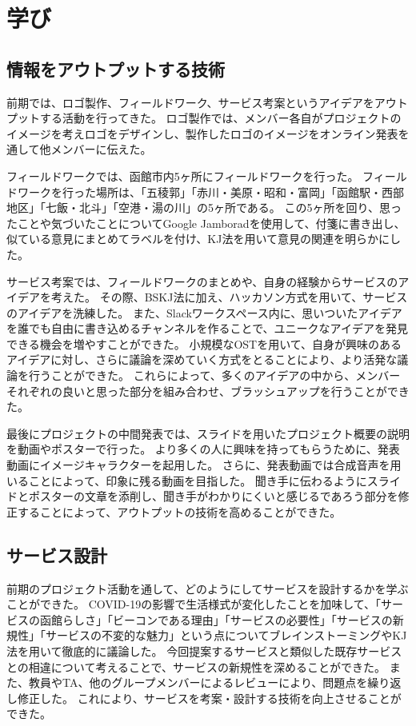 \chapter{学び}

\section{情報をアウトプットする技術}
前期では、ロゴ製作、フィールドワーク、サービス考案というアイデアをアウトプットする活動を行ってきた。
ロゴ製作では、メンバー各自がプロジェクトのイメージを考えロゴをデザインし、製作したロゴのイメージをオンライン発表を通して他メンバーに伝えた。

フィールドワークでは、函館市内5ヶ所にフィールドワークを行った。
フィールドワークを行った場所は、「五稜郭」「赤川・美原・昭和・富岡」「函館駅・西部地区」「七飯・北斗」「空港・湯の川」の5ヶ所である。
この5ヶ所を回り、思ったことや気づいたことについてGoogle Jamboradを使用して、付箋に書き出し、似ている意見にまとめてラベルを付け、KJ法を用いて意見の関連を明らかにした。

サービス考案では、フィールドワークのまとめや、自身の経験からサービスのアイデアを考えた。
その際、BSKJ法に加え、ハッカソン方式を用いて、サービスのアイデアを洗練した。
また、Slackワークスペース内に、思いついたアイデアを誰でも自由に書き込めるチャンネルを作ることで、ユニークなアイデアを発見できる機会を増やすことができた。
小規模なOSTを用いて、自身が興味のあるアイデアに対し、さらに議論を深めていく方式をとることにより、より活発な議論を行うことができた。
これらによって、多くのアイデアの中から、メンバーそれぞれの良いと思った部分を組み合わせ、ブラッシュアップを行うことができた。

最後にプロジェクトの中間発表では、スライドを用いたプロジェクト概要の説明を動画やポスターで行った。
より多くの人に興味を持ってもらうために、発表動画にイメージキャラクターを起用した。
さらに、発表動画では合成音声を用いることによって、印象に残る動画を目指した。
聞き手に伝わるようにスライドとポスターの文章を添削し、聞き手がわかりにくいと感じるであろう部分を修正することによって、アウトプットの技術を高めることができた。

\section{サービス設計}
前期のプロジェクト活動を通して、どのようにしてサービスを設計するかを学ぶことができた。
COVID-19の影響で生活様式が変化したことを加味して、「サービスの函館らしさ」「ビーコンである理由」「サービスの必要性」「サービスの新規性」「サービスの不変的な魅力」という点についてブレインストーミングやKJ法を用いて徹底的に議論した。
今回提案するサービスと類似した既存サービスとの相違について考えることで、サービスの新規性を深めることができた。
また、教員やTA、他のグループメンバーによるレビューにより、問題点を繰り返し修正した。
これにより、サービスを考案・設計する技術を向上させることができた。

